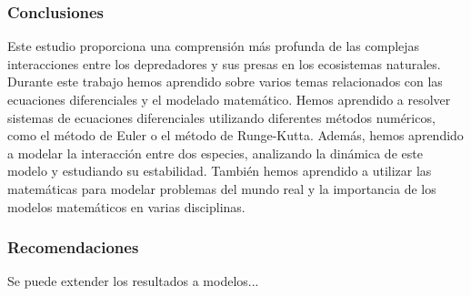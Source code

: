 \documentclass{beamer}
\begin{document}





\begin{frame}
	\frametitle{Conclusiones}
	\begin{minipage}{10cm}
		Este estudio proporciona una comprensi\'on más profunda de las complejas interacciones entre los depredadores y sus presas en
		los ecosistemas naturales. Durante este trabajo hemos aprendido sobre varios temas relacionados con las ecuaciones diferenciales
		y el modelado matemático. Hemos aprendido a resolver sistemas de ecuaciones diferenciales utilizando diferentes
		métodos numéricos, como el método de Euler o el método de Runge-Kutta. Además, hemos aprendido a modelar la interacción entre
		dos especies, analizando la dinámica de este modelo y estudiando su estabilidad. También hemos aprendido a utilizar las matemáticas
		para modelar problemas del mundo real y la importancia de los modelos matemáticos en varias disciplinas.
	\end{minipage}
\end{frame}


\begin{frame}
	\frametitle{Recomendaciones}
	\begin{minipage}{10cm}
		Se puede extender los resultados a modelos...
	\end{minipage}
\end{frame}
\end{document}

